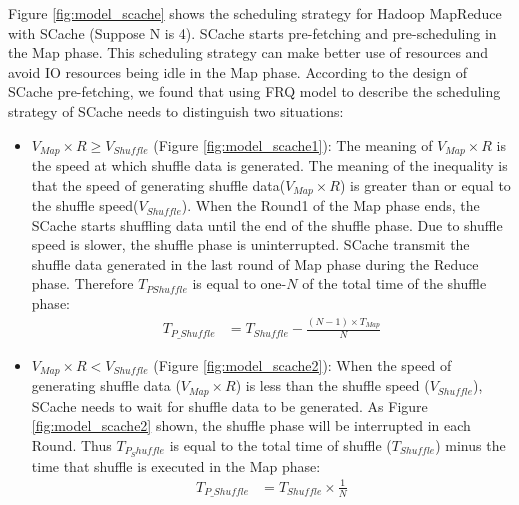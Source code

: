 {Figure \ref{fig:model_scache} shows the scheduling strategy for Hadoop MapReduce with SCache (Suppose N is 4). SCache starts pre-fetching and pre-scheduling in the Map phase. This scheduling strategy can make better use of resources and avoid IO resources being idle in the Map phase. According to the design of SCache pre-fetching, we found that using FRQ model to describe the scheduling strategy of SCache needs to distinguish two situations:

\begin{itemize}
    \item 
    \(V_{Map} \times R \ge V_{Shuffle}\) (Figure \ref{fig:model_scache1}): 
	The meaning of \(V_{Map} \times R\) is the speed at which shuffle data is generated. The meaning of the inequality is that the speed of generating shuffle data(\(V_{Map} \times R\)) is greater than or equal to the shuffle speed(\(V_{Shuffle}\)). When the Round1 of the Map phase ends, the SCache starts shuffling data until the end of the shuffle phase. Due to shuffle speed is slower, the shuffle phase is uninterrupted. SCache transmit the shuffle data generated in the last round of Map phase during the Reduce phase. Therefore \(T_{PShuffle}\) is equal to one-\(N\) of the total time of the shuffle phase:
	\begin{equation}
		\label{equation_Tpshuffle1}
		\begin{aligned}
			T_{P\_Shuffle} &= T_{Shuffle} - \frac{(N - 1)\times T_{Map}}{N}
		\end{aligned}
	\end{equation}
	
    \item \(V_{Map} \times R < V_{Shuffle}\) (Figure \ref{fig:model_scache2}): 
	When the speed of generating shuffle data (\(V_{Map} \times R\)) is less than the shuffle speed (\(V_{Shuffle}\)), SCache needs to wait for shuffle data to be generated. As Figure \ref{fig:model_scache2} shown, the shuffle phase will be interrupted in each Round. Thus \(T_{P_Shuffle}\) is equal to the total time of shuffle (\(T_{Shuffle}\)) minus the time that shuffle is executed in the Map phase:
	\begin{equation}
		\label{equation_Tpshuffle2}
		\begin{aligned}
			T_{P\_Shuffle} &= T_{Shuffle} \times \frac{1}{N}
		\end{aligned}
	\end{equation}
\end{itemize}

}
